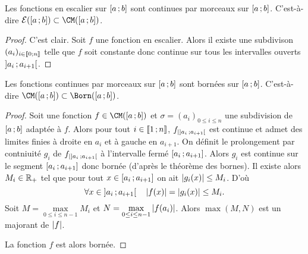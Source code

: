 \begin{prop}
  Les fonctions en escalier sur $\left[ a \, ;  b \right]$ sont continues par morceaux sur $\left[ a \, ;  b \right]$. C'est-à-dire $\E(\intervalleff{a}{b}) \subset \CM(\intervalleff{a}{b})$.
\end{prop}
\begin{proof}
  C'est clair. Soit $f$ une fonction en escalier. Alors il existe une subdivison $(a_i)_{i \in \mathopen{\llbracket}0\mathclose{}\mathpunct{};n\mathclose{\rrbracket}}$ telle que $f$ soit constante donc continue sur tous les intervalles ouverts $\left] a_i \, ;  a_{i+1} \right[$.
\end{proof}

\begin{prop}
  Les fonctions continues par morceaux sur $\left[ a \, ;  b \right]$ sont bornées sur $\left[ a \, ;  b \right]$. C'est-à-dire $\CM(\intervalleff{a}{b}) \subset \Born(\intervalleff{a}{b})$.
\end{prop}
\begin{proof}
  Soit une fonction $f \in \CM(\intervalleff{a}{b})$ et $\sigma=(a_i)_{0 \leq i \leq n}$ une subdivision de $\left[ a \, ;  b \right]$ adaptée à $f$. Alors pour tout $i \in \mathopen{\llbracket}1\mathclose{}\mathpunct{};n\mathclose{\rrbracket}$, $f_{|\left] a_i \, ;  a_{i+1} \right[}$ est continue et admet des limites finies à droite en $a_{i}$ et à gauche en $a_{i+1}$. On définit le prolongement par contniuité $g_i$ de $f_{|\left] a_i \, ;  a_{i+1} \right[}$ à l'intervalle fermé $\left[ a_i \, ;  a_{i+1} \right]$. Alors $g_i$ est continue sur le segment $\left[ a_i \, ;  a_{i+1} \right]$ donc bornée (d'après le théorème des bornes). Il existe alors $M_i \in \mathbb{R}_+$ tel que pour tout $x \in \left[ a_i \, ;  a_{i+1} \right] $ on ait $\left\lvert g_i(x)\right\rvert \leq M_i$. D'où
  \begin{equation}
    \forall x \in \left] a_i \, ;  a_{i+1} \right[ \quad \left\lvert f(x)\right\rvert=\left\lvert g_i(x)\right\rvert \leq M_i.
  \end{equation}
  Soit $M=\max\limits_{0 \leq i \leq n-1} M_i$ et $N=\max\limits_{0 \leq i \leq n-1} \left\lvert f(a_i)\right\rvert$. Alors $\max(M,N)$ est un majorant de $\left\lvert f\right\rvert$.

  La fonction $f$ est alors bornée.
\end{proof}

